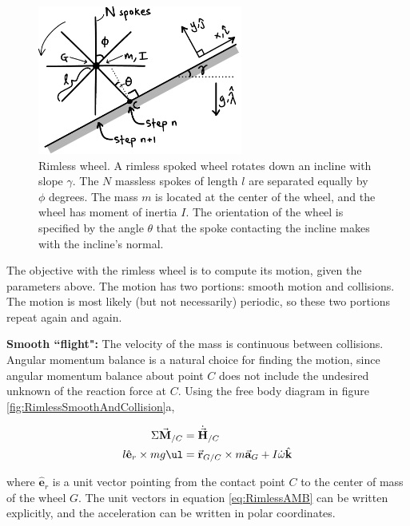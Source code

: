 \begin{figure}[h]		%
\begin{centering}
\includegraphics[width=0.6\textwidth]{Figures/RimlessWheel}\par
\end{centering}
\caption[Diagram: Rimless Wheel]{Rimless wheel. A rimless spoked wheel rotates down an incline with slope $\gamma$. The $N$ massless spokes of length $l$ are separated equally by $\phi$ degrees. The mass $m$ is located at the center of the wheel, and the wheel has moment of inertia $I$. The orientation of the wheel is specified by the angle $\theta$ that the spoke contacting the incline makes with the incline's normal.}
\label{fig:RimlessWheel}
\end{figure}
%

The objective with the rimless wheel is to compute its motion, given the parameters above. The motion has two portions: smooth motion and collisions. The motion is most likely (but not necessarily) periodic, so these two portions repeat again and again.

\textbf{Smooth ``flight":} The velocity of the mass is continuous between collisions. Angular momentum balance is a natural choice for finding the motion, since angular momentum balance about point $C$ does not include the undesired unknown of the reaction force at $C$. Using the free body diagram in figure \ref{fig:RimlessSmoothAndCollision}a,

\begin{align}
\Sigma \vec{\mathbf{M}}_{/C} &= \dot{\vec{\mathbf{H}}}_{/C} \notag \\
l \hat{\mathbf{e}}_r \times mg \ul &= \vec{\mathbf{r}}_{G/C} \times m\vec{\mathbf{a}}_G + I \dot{\omega} \hat{\mathbf{k}}
\label{eq:RimlessAMB}
\end{align}

where $\hat{\mathbf{e}}_{r}$ is a unit vector pointing from the contact point $C$ to the center of mass of the wheel $G$. The unit vectors in equation \ref{eq:RimlessAMB} can be written explicitly, and the acceleration can be written in polar coordinates.

